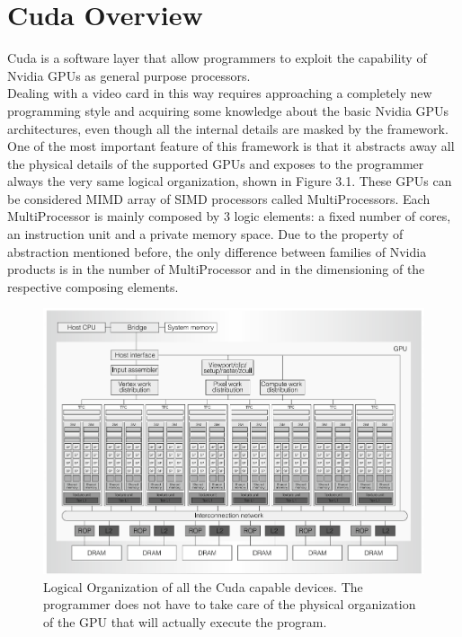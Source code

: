 \section{Cuda Overview}\label{sec:i}
Cuda is a software layer that allow programmers to exploit the capability of Nvidia GPUs as general purpose processors.\\
Dealing with a video card in this way requires approaching a completely new programming style and acquiring some knowledge about the basic Nvidia GPUs architectures, even though all the internal details are masked by the framework.\\
One of the most important feature of this framework is that it abstracts away all the physical details of the supported GPUs and exposes to the programmer always the very same logical organization, shown in Figure 3.1. These GPUs can be considered MIMD array of SIMD processors called MultiProcessors. Each MultiProcessor is mainly composed by 3 logic elements: a fixed number of cores, an instruction unit and a private memory space. Due to the property of abstraction mentioned before, the only difference between families of Nvidia products is in the number of MultiProcessor and in the dimensioning of the respective composing elements.\\

\begin{figure}[h!bt]
	\centerline{\includegraphics[width=\textwidth]{img/NvidiaGPUsLogicalOrg.png}}
	\caption{Logical Organization of all the Cuda capable devices. The programmer does not have to take care of the physical organization of the GPU that will actually execute the program.}
	\label{fig:NvidiaGPUsLogicalOrg}
\end{figure}

